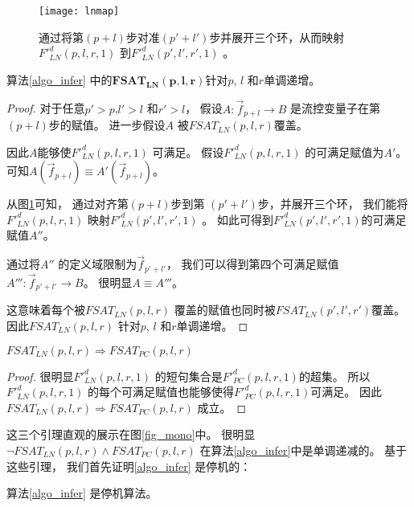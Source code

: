 \begin{figure}[b]
\begin{center}
\texttt{[image: lnmap]}
\end{center}
\caption{通过将第$(p+l)$步对准$(p'+l')$步并展开三个环，从而映射$F'^d_{LN}(p,l,r,1)$ 到$F'^d_{LN}(p',l',r',1)$ 。}
  \label{fig_lnmap}
\end{figure}

\begin{lemma}\label{lemmalninc}
算法\ref{algo_infer} 中的$\mathbf{FSAT_{LN}(p,l,r)}$针对$p$, $l$ 和$r$单调递增。
\end{lemma}
\begin{proof}
对于任意$p'>p$,$l'>l$ 和$r'>l$，
假设$A:\vec{f}_{p+l}\to B$ 是流控变量子在第$(p+l)$步的赋值。
进一步假设$A$ 被$FSAT_{LN}(p,l,r)$覆盖。

因此$A$能够使$F'^d_{LN}(p,l,r,1)$ 可满足。
假设$F'^d_{LN}(p,l,r,1)$ 的可满足赋值为$A'$。
可知$A(\vec{f}_{p+l})\equiv A'(\vec{f}_{p+l})$。

从图\ref{fig_lnmap}可知，
通过对齐第$(p+l)$步到第 $(p'+l')$步，并展开三个环，
我们能将$F'^d_{LN}(p,l,r,1)$ 映射$F'^d_{LN}(p',l',r',1)$ 。
如此可得到$F'^d_{LN}(p',l',r',1)$的可满足赋值$A''$。

通过将$A''$ 的定义域限制为$\vec{f}_{p'+l'}$，
我们可以得到第四个可满足赋值$A''':\vec{f}_{p'+l'}\to B$。
很明显$A\equiv A'''$。

这意味着每个被$FSAT_{LN}(p,l,r)$ 覆盖的赋值也同时被$FSAT_{LN}(p',l',r')$覆盖。
因此$FSAT_{LN}(p,l,r)$ 针对$p$, $l$ 和$r$单调递增。
\end{proof}


\begin{lemma}\label{lemmaln2pc}
$FSAT_{LN}(p,l,r)\Rightarrow FSAT_{PC}(p,l,r)$
\end{lemma}
\begin{proof}
很明显$F'^d_{LN}(p,l,r,1)$ 的短句集合是$F'^d_{PC}(p,l,r,1)$的超集。
所以$F'^d_{LN}(p,l,r,1)$ 的每个可满足赋值也能够使得$F'^d_{PC}(p,l,r,1)$可满足。
因此$FSAT_{LN}(p,l,r)\Rightarrow FSAT_{PC}(p,l,r)$ 成立。
\end{proof}

这三个引理直观的展示在图\ref{fig_mono}中。
很明显$\neg FSAT_{LN}(p,l,r)\wedge FSAT_{PC}(p,l,r)$ 在算法\ref{algo_infer}中是单调递减的。
基于这些引理，
我们首先证明\ref{algo_infer} 是停机的：

\begin{theorem}
算法\ref{algo_infer} 是停机算法。
\end{theorem}


